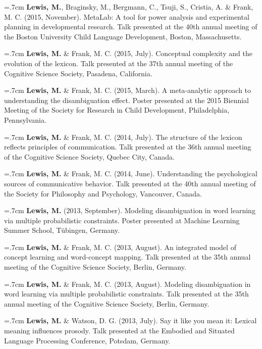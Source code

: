 \documentclass[letterpaper]{article}
\begin{document}
\hangindent=.7cm {\bf Lewis, M.},  Braginsky,  M.,  Bergmann, C., Tsuji, S., Cristia, A. \& Frank, M. C. (2015, November). MetaLab: A tool for power analysis and experimental planning in developmental research. Talk presented at the 40th annual meeting of the Boston University Child Language Development, Boston, Massachusetts.

\hangindent=.7cm {\bf Lewis, M.} \& Frank, M. C. (2015, July). Conceptual complexity and the evolution of the lexicon. Talk presented at the 37th annual meeting of the Cognitive Science Society, Pasadena, California.

\hangindent=.7cm {\bf Lewis, M.} \& Frank, M. C. (2015, March). A meta-analytic approach to understanding the disambiguation effect. Poster presented at  the 2015 Biennial Meeting of the Society for Research in Child Development, Philadelphia, Pennsylvania.



\hangindent=.7cm {\bf Lewis, M.} \& Frank, M. C. (2014, July). The structure of the lexicon reflects  principles of communication. Talk presented at the 36th annual meeting of the Cognitive Science Society, Quebec City, Canada.

\hangindent=.7cm {\bf Lewis, M.} \& Frank, M. C. (2014, June). Understanding the psychological sources of communicative behavior. Talk presented at the 40th annual meeting of the Society for Philosophy and Psychology, Vancouver, Canada.

 \hangindent=.7cm {\bf Lewis, M.} (2013, September). Modeling disambiguation in word learning via multiple probabilistic constraints. Poster presented at Machine Learning Summer School, T\"{u}bingen, Germany.
 


 \hangindent=.7cm {\bf Lewis, M.}  \& Frank, M. C. (2013, August). An integrated model of concept learning and word-concept mapping. Talk presented at the 35th annual meeting of the Cognitive Science Society, Berlin, Germany.
 
 \hangindent=.7cm {\bf Lewis, M.}  \& Frank, M. C.  (2013, August). Modeling disambiguation in word learning via multiple probabilistic constraints. Talk presented at the 35th annual meeting of the Cognitive Science Society, Berlin, Germany.
 
  \hangindent=.7cm {\bf Lewis, M.} \& Watson, D. G.  (2013, July). Say it like you mean it: Lexical meaning influences prosody. Talk presented at the Embodied and Situated Language Processing Conference, Potsdam, Germany.
 
\end{document}
